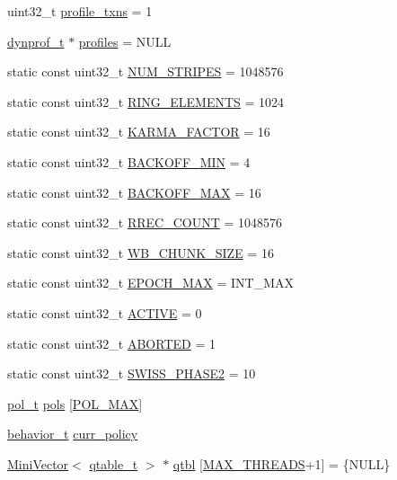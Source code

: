 \begin{DoxyCompactItemize}
uint32\-\_\-t \hyperlink{namespacestm_a3b7951049cf91d2e3d63444f6aa31b31}{profile\-\_\-txns} = 1
\item 
\hyperlink{structstm_1_1dynprof__t}{dynprof\-\_\-t} $\ast$ \hyperlink{namespacestm_a0c5d34db2778717a0766a164ccf9b40f}{profiles} = N\-U\-L\-L
\item 
static const uint32\-\_\-t \hyperlink{namespacestm_ac333fa1ea03145d9c5d601624ab507eb}{N\-U\-M\-\_\-\-S\-T\-R\-I\-P\-E\-S} = 1048576
\item 
static const uint32\-\_\-t \hyperlink{namespacestm_aff01348819bdc4955bee1bfbecd22c1a}{R\-I\-N\-G\-\_\-\-E\-L\-E\-M\-E\-N\-T\-S} = 1024
\item 
static const uint32\-\_\-t \hyperlink{namespacestm_a803f7da233820c0cb019e9916ac87207}{K\-A\-R\-M\-A\-\_\-\-F\-A\-C\-T\-O\-R} = 16
\item 
static const uint32\-\_\-t \hyperlink{namespacestm_a5db105c525a0fc1848a80d674c441052}{B\-A\-C\-K\-O\-F\-F\-\_\-\-M\-I\-N} = 4
\item 
static const uint32\-\_\-t \hyperlink{namespacestm_a998e4e0c954ef37eefab31f44ff016d7}{B\-A\-C\-K\-O\-F\-F\-\_\-\-M\-A\-X} = 16
\item 
static const uint32\-\_\-t \hyperlink{namespacestm_ac811b3e7503fcf79d860e5a9f997f673}{R\-R\-E\-C\-\_\-\-C\-O\-U\-N\-T} = 1048576
\item 
static const uint32\-\_\-t \hyperlink{namespacestm_ac13bcf2e446994b6bc58c29f207b61ab}{W\-B\-\_\-\-C\-H\-U\-N\-K\-\_\-\-S\-I\-Z\-E} = 16
\item 
static const uint32\-\_\-t \hyperlink{namespacestm_ad8467c8fd66bee04be744334bc17b75e}{E\-P\-O\-C\-H\-\_\-\-M\-A\-X} = I\-N\-T\-\_\-\-M\-A\-X
\item 
static const uint32\-\_\-t \hyperlink{namespacestm_adf9ac55b7a24ef9715c8e425928b580b}{A\-C\-T\-I\-V\-E} = 0
\item 
static const uint32\-\_\-t \hyperlink{namespacestm_aac91219d15a450587c7cbb52db4b13fd}{A\-B\-O\-R\-T\-E\-D} = 1
\item 
static const uint32\-\_\-t \hyperlink{namespacestm_a08d03c541bfa9d260904138ed0ccda6b}{S\-W\-I\-S\-S\-\_\-\-P\-H\-A\-S\-E2} = 10
\item 
\hyperlink{structstm_1_1pol__t}{pol\-\_\-t} \hyperlink{namespacestm_a533577214af07c44f099eb536d8dece7}{pols} \mbox{[}\hyperlink{namespacestm_a4fbece2613ac8fc61e22d91bac698493ae9cfae39bec896ef08d7792295866d60}{P\-O\-L\-\_\-\-M\-A\-X}\mbox{]}
\item 
\hyperlink{structstm_1_1behavior__t}{behavior\-\_\-t} \hyperlink{namespacestm_ab5f6db774c01e9a0e2aec0173d0481b1}{curr\-\_\-policy}
\item 
\hyperlink{classstm_1_1MiniVector}{Mini\-Vector}$<$ \hyperlink{structstm_1_1qtable__t}{qtable\-\_\-t} $>$ $\ast$ \hyperlink{namespacestm_a93eff2ad5eaf4e9c0661b0214c35bd1b}{qtbl} \mbox{[}\hyperlink{namespacestm_a41da58ff755b92c2c2903c8e2844f6c4}{M\-A\-X\-\_\-\-T\-H\-R\-E\-A\-D\-S}+1\mbox{]} = \{N\-U\-L\-L\}
\end{DoxyCompactItemize}


